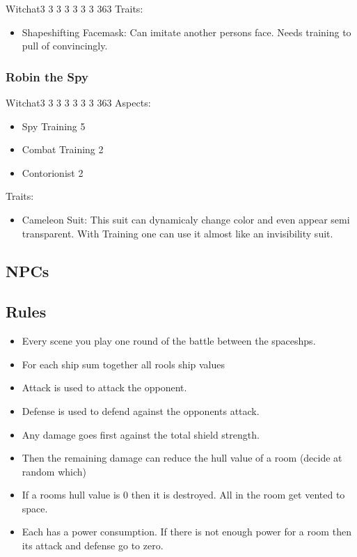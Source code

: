 \documentclass[11pt]{article}
\begin{document}
{\begin{npc}{Witch}{at}{3 3 3 3 3 3 3 3}{63}
Traits:
\begin{itemize}
\item Shapeshifting Facemask: Can imitate another persons face. Needs training to pull of convincingly.
\end{itemize}
\end{npc}
\subsubsection{Robin the Spy}
\label{sec:orgb9e4337}

\begin{npc}{Witch}{at}{3 3 3 3 3 3 3 3}{63}
Aspects:
\begin{itemize}
\item Spy  Training 5
\item Combat Training 2
\item Contorionist 2
\end{itemize}
\columnbreak

Traits:
\begin{itemize}
\item Cameleon Suit: This suit can dynamicaly change color and even appear semi transparent. With Training one can use it almost like an invisibility suit.
\end{itemize}
\end{npc}
\subsection{NPCs}
\label{sec:orgab65986}

\subsection{Rules}
\label{sec:org3902ccc}

\begin{itemize}
\item Every scene you play one round of the battle between the spaceshps.
\item For each ship sum together all rools ship values
\item Attack is used to attack the opponent.
\item Defense is used to defend against the opponents attack.
\item Any damage goes first against the total shield strength.
\item Then the remaining damage can reduce the hull value of a room (decide at random which)
\item If a rooms hull value is 0 then it is destroyed. All in the room get vented to space.
\item Each has a power consumption. If there is not enough power for a room then its attack and defense go to zero.
\end{itemize}
}
\end{document}
